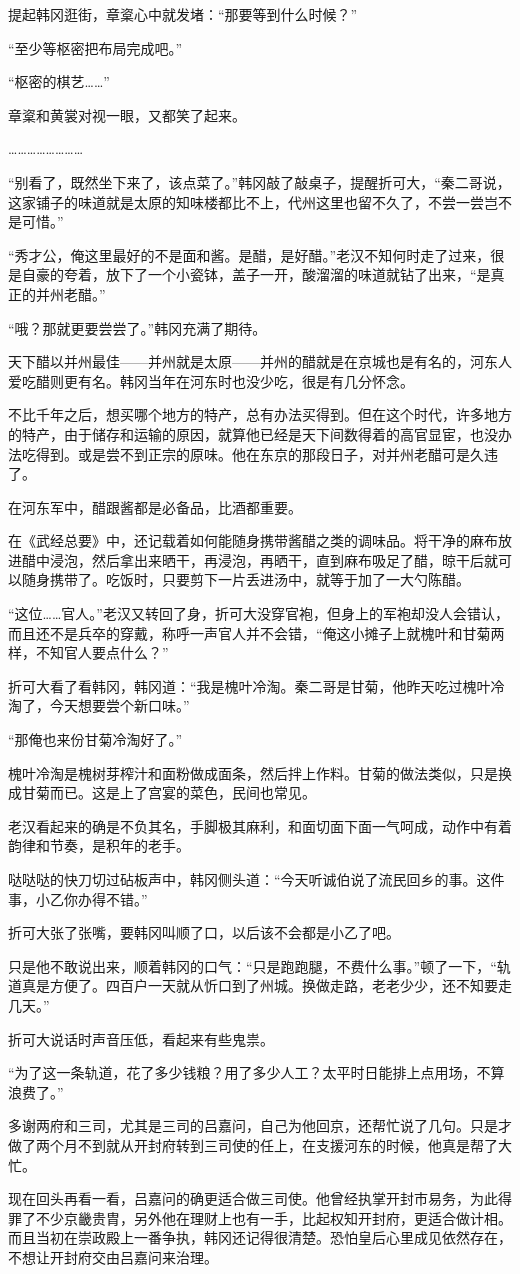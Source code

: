 提起韩冈逛街，章楶心中就发堵：“那要等到什么时候？”

“至少等枢密把布局完成吧。”

“枢密的棋艺……”

章楶和黄裳对视一眼，又都笑了起来。

……………………

“别看了，既然坐下来了，该点菜了。”韩冈敲了敲桌子，提醒折可大，“秦二哥说，这家铺子的味道就是太原的知味楼都比不上，代州这里也留不久了，不尝一尝岂不是可惜。”

“秀才公，俺这里最好的不是面和酱。是醋，是好醋。”老汉不知何时走了过来，很是自豪的夸着，放下了一个小瓷钵，盖子一开，酸溜溜的味道就钻了出来，“是真正的并州老醋。”

“哦？那就更要尝尝了。”韩冈充满了期待。

天下醋以并州最佳——并州就是太原——并州的醋就是在京城也是有名的，河东人爱吃醋则更有名。韩冈当年在河东时也没少吃，很是有几分怀念。

不比千年之后，想买哪个地方的特产，总有办法买得到。但在这个时代，许多地方的特产，由于储存和运输的原因，就算他已经是天下间数得着的高官显宦，也没办法吃得到。或是尝不到正宗的原味。他在东京的那段日子，对并州老醋可是久违了。

在河东军中，醋跟酱都是必备品，比酒都重要。

在《武经总要》中，还记载着如何能随身携带酱醋之类的调味品。将干净的麻布放进醋中浸泡，然后拿出来晒干，再浸泡，再晒干，直到麻布吸足了醋，晾干后就可以随身携带了。吃饭时，只要剪下一片丢进汤中，就等于加了一大勺陈醋。

“这位……官人。”老汉又转回了身，折可大没穿官袍，但身上的军袍却没人会错认，而且还不是兵卒的穿戴，称呼一声官人并不会错，“俺这小摊子上就槐叶和甘菊两样，不知官人要点什么？”

折可大看了看韩冈，韩冈道：“我是槐叶冷淘。秦二哥是甘菊，他昨天吃过槐叶冷淘了，今天想要尝个新口味。”

“那俺也来份甘菊冷淘好了。”

槐叶冷淘是槐树芽榨汁和面粉做成面条，然后拌上作料。甘菊的做法类似，只是换成甘菊而已。这是上了宫宴的菜色，民间也常见。

老汉看起来的确是不负其名，手脚极其麻利，和面切面下面一气呵成，动作中有着韵律和节奏，是积年的老手。

哒哒哒的快刀切过砧板声中，韩冈侧头道：“今天听诚伯说了流民回乡的事。这件事，小乙你办得不错。”

折可大张了张嘴，要韩冈叫顺了口，以后该不会都是小乙了吧。

只是他不敢说出来，顺着韩冈的口气：“只是跑跑腿，不费什么事。”顿了一下，“轨道真是方便了。四百户一天就从忻口到了州城。换做走路，老老少少，还不知要走几天。”

折可大说话时声音压低，看起来有些鬼祟。

“为了这一条轨道，花了多少钱粮？用了多少人工？太平时日能排上点用场，不算浪费了。”

多谢两府和三司，尤其是三司的吕嘉问，自己为他回京，还帮忙说了几句。只是才做了两个月不到就从开封府转到三司使的任上，在支援河东的时候，他真是帮了大忙。

现在回头再看一看，吕嘉问的确更适合做三司使。他曾经执掌开封市易务，为此得罪了不少京畿贵胄，另外他在理财上也有一手，比起权知开封府，更适合做计相。而且当初在崇政殿上一番争执，韩冈还记得很清楚。恐怕皇后心里成见依然存在，不想让开封府交由吕嘉问来治理。
